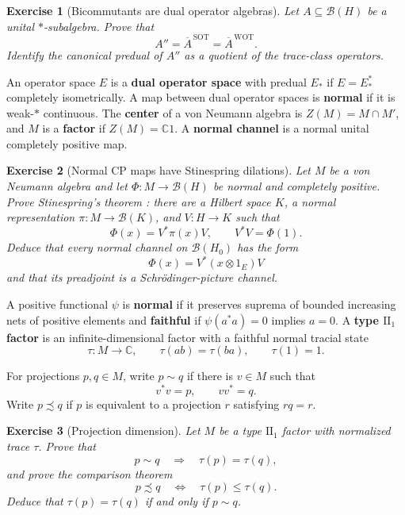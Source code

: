 \documentclass{article}
\newtheorem{exercise}{Exercise}
\begin{document}
\begin{exercise}[Bicommutants are dual operator algebras]\leavevmode\par
\textit{Let $A\subseteq\mathcal B(H)$ be a unital $*$-subalgebra. Prove that}
\[
A''
=\overline A^{\,\mathrm{SOT}}
=\overline A^{\,\mathrm{WOT}}.
\]
\textit{Identify the canonical predual of $A''$ as a quotient of the
trace-class operators.}
\end{exercise}

An operator space $E$ is a \textbf{dual operator space} with predual $E_*$ if
$E=E_*^*$ completely isometrically. A map between dual operator spaces is
\textbf{normal} if it is weak-$*$ continuous. The \textbf{center} of a von
Neumann algebra is $Z(M)=M\cap M'$, and $M$ is a \textbf{factor} if
$Z(M)=\mathbb C1$. A \textbf{normal channel} is a normal unital completely
positive map.

\begin{exercise}[Normal CP maps have Stinespring dilations]
\leavevmode\par
\textit{Let $M$ be a von Neumann algebra and let
$\Phi:M\to\mathcal B(H)$ be normal and completely positive. Prove
Stinespring's theorem \cite{stinespring}: there are a Hilbert space $K$, a
normal representation $\pi:M\to\mathcal B(K)$, and $V:H\to K$ such that}
\[
\Phi(x)=V^*\pi(x)V,
\qquad
V^*V=\Phi(1).
\]
\textit{Deduce that every normal channel on $\mathcal B(H_0)$ has the form}
\[
\Phi(x)=V^*(x\otimes1_E)V
\]
\textit{and that its preadjoint is a Schr\"odinger-picture channel.}
\end{exercise}

A positive functional $\psi$ is \textbf{normal} if it preserves suprema of
bounded increasing nets of positive elements and \textbf{faithful} if
$\psi(a^*a)=0$ implies $a=0$. A \textbf{type $\mathrm{II}_1$ factor} is an
infinite-dimensional factor with a faithful normal tracial state
\[
\tau:M\longrightarrow\mathbb C,
\qquad
\tau(ab)=\tau(ba),
\qquad
\tau(1)=1.
\]

For projections $p,q\in M$, write $p\sim q$ if there is $v\in M$ such that
\[
v^*v=p,
\qquad
vv^*=q.
\]
Write $p\precsim q$ if $p$ is equivalent to a projection $r$ satisfying $rq=r$.

\begin{exercise}[Projection dimension]\leavevmode\par
\textit{Let $M$ be a type $\mathrm{II}_1$ factor with normalized trace $\tau$. Prove that}
\[
p\sim q\quad\Longrightarrow\quad\tau(p)=\tau(q),
\]
\textit{and prove the comparison theorem}
\[
p\precsim q
\quad\Longleftrightarrow\quad
\tau(p)\leq\tau(q).
\]
\textit{Deduce that $\tau(p)=\tau(q)$ if and only if $p\sim q$.}
\end{exercise}
\end{document}

